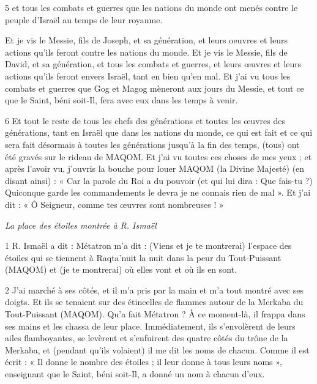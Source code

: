 \par 5 et tous les combats et guerres que les nations du monde ont menés contre le peuple d'Israël au temps de leur royaume.

\par Et je vis le Messie, fils de Joseph, et sa génération, et leurs oeuvres et leurs actions qu'ils feront contre les nations du monde. Et je vis le Messie, fils de David, et sa génération, et tous les combats et guerres, et leurs œuvres et leurs actions qu'ils feront envers Israël, tant en bien qu'en mal. Et j'ai vu tous les combats et guerres que Gog et Magog mèneront aux jours du Messie, et tout ce que le Saint, béni soit-Il, fera avec eux dans les temps à venir.

\par 6 Et tout le reste de tous les chefs des générations et toutes les œuvres des générations, tant en Israël que dans les nations du monde, ce qui est fait et ce qui sera fait désormais à toutes les générations jusqu'à la fin des temps, (tous) ont été gravés sur le rideau de MAQOM. Et j'ai vu toutes ces choses de mes yeux ; et après l'avoir vu, j'ouvris la bouche pour louer MAQOM (la Divine Majesté) (en disant ainsi) : « Car la parole du Roi a du pouvoir (et qui lui dira : Que fais-tu ?) Quiconque garde les commandements le devra je ne connais rien de mal ». Et j’ai dit : « Ô Seigneur, comme tes œuvres sont nombreuses ! »




\par \textit{La place des étoiles montrée à R. Ismaël}

\par 1 R. Ismaël a dit : Métatron m'a dit : (Viens et je te montrerai) l'espace des étoiles qui se tiennent à Raqta'nuit la nuit dans la peur du Tout-Puissant (MAQOM) et (je te montrerai) où elles vont et où ils en sont.

\par 2 J'ai marché à ses côtés, et il m'a pris par la main et m'a tout montré avec ses doigts. Et ils se tenaient sur des étincelles de flammes autour de la Merkaba du Tout-Puissant (MAQOM). Qu'a fait Métatron ? À ce moment-là, il frappa dans ses mains et les chassa de leur place. Immédiatement, ils s'envolèrent de leurs ailes flamboyantes, se levèrent et s'enfuirent des quatre côtés du trône de la Merkaba, et (pendant qu'ils volaient) il me dit les noms de chacun. Comme il est écrit : « Il donne le nombre des étoiles ; il leur donne à tous leurs noms », enseignant que le Saint, béni soit-Il, a donné un nom à chacun d'eux.

